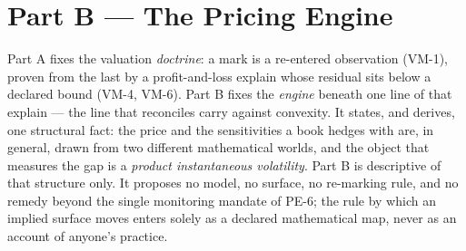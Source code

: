 
\providecommand{\pelabel}[1]{\leavevmode\hypertarget{pe-#1}{}%
  \marginpar{\raggedright\scriptsize\ttfamily #1}}
\providecommand{\trace}[1]{\par\smallskip{\small\itshape (#1)}}
\providecommand{\dd}{\mathrm{d}}
\providecommand{\Vanna}{\mathrm{Vanna}}
\providecommand{\Volga}{\mathrm{Volga}}
\providecommand{\Gadj}{\Gamma_{\mathrm{adj}}}
\providecommand{\smod}{\sigma_{\mathrm{mod}}}
\providecommand{\sprod}{\sigma_{\mathrm{prod}}}
\providecommand{\Dhyb}{\Delta_{\mathrm{hyb}}}
\providecommand{\Ghyb}{\Gamma_{\mathrm{hyb}}}
\providecommand{\satm}{\sigma_{\mathrm{ATM}}}
\providecommand{\ssm}{\sigma_{\mathrm{smile}}}
\providecommand{\lF}{\ell_F}
\providecommand{\Fref}{F_{\mathrm{ref}}}
\providecommand{\volslope}{\mathrm{vol.slope}}

\section*{Part B --- The Pricing Engine}

Part A fixes the valuation \emph{doctrine}: a mark is a re-entered
observation (VM-1), proven from the last by a profit-and-loss explain
whose residual sits below a declared bound (VM-4, VM-6). Part B fixes the
\emph{engine} beneath one line of that explain --- the line that reconciles
carry against convexity. It states, and derives, one structural fact: the
price and the sensitivities a book hedges with are, in general, drawn from
two different mathematical worlds, and the object that measures the gap is
a \emph{product instantaneous volatility}. Part B is descriptive of that
structure only. It proposes no model, no surface, no re-marking rule, and
no remedy beyond the single monitoring mandate of PE-6; the rule by which
an implied surface moves enters solely as a declared mathematical map, never
as an account of anyone's practice.

